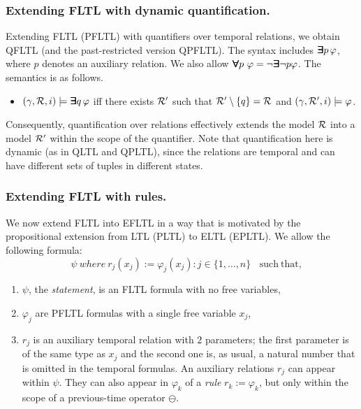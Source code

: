 \subsubsection{Extending FLTL with dynamic quantification.}




Extending FLTL (PFLTL) with quantifiers over temporal relations, we obtain QFLTL
(and the past-restricted version QPFLTL). 
The syntax includes $\bm{\exists}\kern-0.6em\bm{\exists} p \, \varphi$, 
where $p$ denotes an auxiliary relation.
We also allow $\bm{\forall}\kern-0.6em\bm{\forall} p\ \varphi = \neg \bm{\exists}\kern-0.6em\bm{\exists} \neg p \varphi$. The semantics is as follows. %




\begin{itemize}
\item $(\gamma ,  {\cal R}, i) \models \bm{\exists}\kern-0.6em\bm{\exists} q \, \varphi$ iff there exists
${\cal R}'$ such that ${\cal R}' \setminus {\{ q \} } = {\cal R}$ and 
$( \gamma, {\cal R}' , i) \models \varphi$.
\end{itemize}
Consequently, quantification over relations effectively extends the model ${\cal R}$ into a model ${\cal R}'$ within the scope of the quantifier. Note that quantification here is dynamic (as in QLTL and QPLTL), since the relations are temporal and can have different sets of tuples in different states.

\subsubsection{Extending FLTL  with rules.}

We now extend FLTL into EFLTL in a way that is motivated by the  propositional extension from LTL (PLTL) to ELTL (EPLTL). We allow the following formula:
\begin{equation}
\label{EFLTL}
\ \ \ \ \ \psi \mathit{\ where\ } r_j  ( x_j ) := 
\varphi_j (x_j) : j \in \{ 1 , \ldots , n \} \mathrm{\ \ \ \     such\ that,}
\end{equation}
\begin{enumerate}
\item $\psi$, the {\em statement}, is an FLTL formula with
no free variables, 
\item $\varphi_j$ are PFLTL formulas with a single
free variable $x_j$,
\item $r_j$ is an auxiliary temporal relation with $2$ parameters; the first parameter is of the same 
type as $x_j$ and the second one is, as usual,
a natural number that is omitted in the temporal formulas. 
An auxiliary relations $r_j$ can appear within $\psi$. They can also appear in $\varphi_k$ of a {\em rule} $r_k := \varphi_k$, but only within the
scope
of a previous-time operator $\ominus$. 
\end{enumerate}



